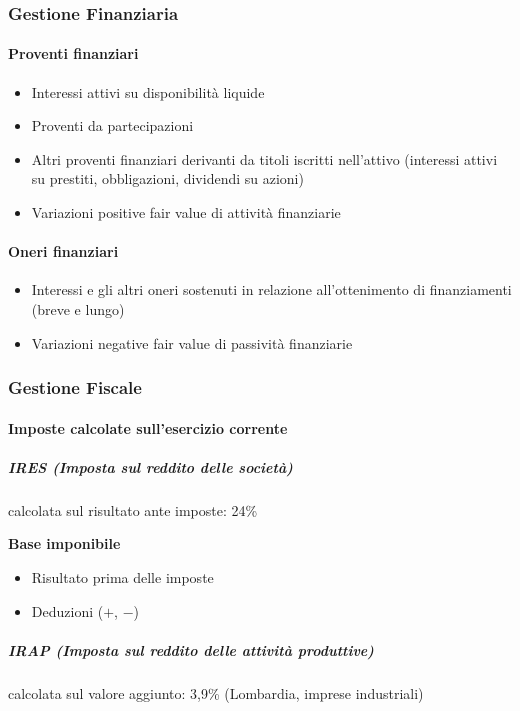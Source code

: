 \subsubsection{Gestione Finanziaria}

\paragraph{Proventi finanziari}
\begin{itemize}
    \item Interessi attivi su disponibilità liquide
    \item Proventi da partecipazioni
    \item Altri proventi finanziari derivanti da titoli iscritti nell’attivo (interessi
    attivi su prestiti, obbligazioni, dividendi su azioni)
    \item Variazioni positive fair value di attività finanziarie
\end{itemize}

\paragraph{Oneri finanziari}
\begin{itemize}
    \item Interessi e gli altri oneri sostenuti in relazione all’ottenimento di
    finanziamenti (breve e lungo)
    \item Variazioni negative fair value di passività finanziarie
\end{itemize}

\subsubsection{Gestione Fiscale}
\paragraph{Imposte calcolate sull’esercizio corrente}

\subparagraph{IRES (Imposta sul reddito delle società)}
calcolata sul risultato ante imposte: 24\%

\textbf{Base imponibile}
\begin{itemize}
    \item Risultato prima delle imposte 
    \item Deduzioni ($+$, $-$)
\end{itemize}

\subparagraph{IRAP (Imposta sul reddito delle attività produttive)}
calcolata sul valore aggiunto: 3,9\% (Lombardia, imprese industriali)

